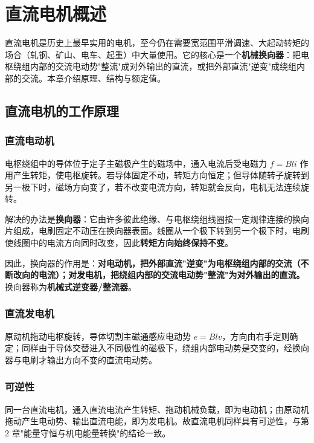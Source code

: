 \chapter{直流电机概述}

直流电机是历史上最早实用的电机，至今仍在需要宽范围平滑调速、大起动转矩的场合（轧钢、矿山、电车、起重）中大量使用。它的核心是一个\textbf{机械换向器}：把电枢绕组内部的交流电动势"整流"成对外输出的直流，或把外部直流"逆变"成绕组内部的交流。本章介绍原理、结构与额定值。

\section{直流电机的工作原理}

\subsection{直流电动机}
电枢绕组中的导体位于定子主磁极产生的磁场中，通入电流后受电磁力 $f=Bli$ 作用产生转矩，使电枢旋转。若导体固定不动，转矩方向恒定；但导体随转子旋转到另一极下时，磁场方向变了，若不改变电流方向，转矩就会反向，电机无法连续旋转。

解决的办法是\textbf{换向器}：它由许多彼此绝缘、与电枢绕组线圈按一定规律连接的换向片组成，电刷固定不动压在换向器表面。线圈从一个极下转到另一个极下时，电刷使线圈中的电流方向同时改变，因此\textbf{转矩方向始终保持不变}。

因此，换向器的作用是：\textbf{对电动机，把外部直流"逆变"为电枢绕组内部的交流（不断改向的电流）；对发电机，把绕组内部的交流电动势"整流"为对外输出的直流。}换向器称为\textbf{机械式逆变器/整流器}。

\subsection{直流发电机}
原动机拖动电枢旋转，导体切割主磁通感应电动势 $e=Blv$，方向由右手定则确定；同样由于导体交替进入不同极性的磁极下，绕组内部电动势是交变的，经换向器与电刷才输出方向不变的直流电动势。

\subsection{可逆性}
同一台直流电机，通入直流电流产生转矩、拖动机械负载，即为电动机；由原动机拖动产生电动势、输出直流电能，即为发电机。故直流电机同样具有可逆性，与第 2 章"能量守恒与机电能量转换"的结论一致。

